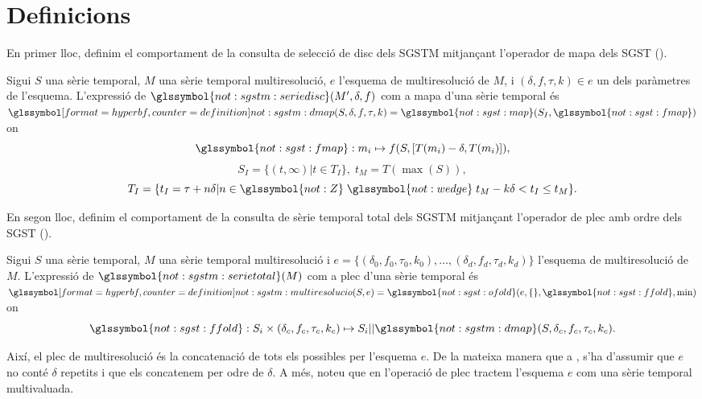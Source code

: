 \section{Definicions}

En primer lloc, definim el comportament de la consulta de selecció de disc
dels \gls{SGSTM} mitjançant l'operador de mapa dels \gls{SGST}
().


\begin{definition}
Sigui $S$ una sèrie temporal, $M$ una sèrie temporal multiresolució,
$e$ l'esquema de multiresolució de $M$, i $(\delta,f,\tau,k)\in e$
un dels paràmetres de l'esquema. L'expressió de
$\glssymbol{not:sgstm:seriedisc}(M',\delta,f)$ com a mapa d'una sèrie
temporal és $\glssymboldef{not:sgstm:dmap}(S,\delta,f,\tau,k)=
\glssymbol{not:sgst:map}(S_I,\glssymbol{not:sgst:fmap})$ on
  \[
  \glssymbol{not:sgst:fmap}: m_i\mapsto f(S, [T(m_i)-\delta,T(m_i)]),
  \]
  \[
  S_I = \{ (t,\infty) | t\in T_I  \},\;  t_M = T(\max(S)),
  \]
  \[
  T_I = \{ t_I = \tau+n\delta | n\in\glssymbol{not:Z}\; \glssymbol{not:wedge}\; t_M - k\delta <
  t_I \leq t_M \}.
  \]
\end{definition}




En segon lloc, definim el comportament de la consulta de sèrie
temporal total dels \gls{SGSTM} mitjançant l'operador de plec amb
ordre dels \gls{SGST} ().


\begin{definition}
  Sigui $S$ una sèrie temporal, $M$ una sèrie temporal multiresolució
  i $e = \{ (\delta_0,f_0,\tau_0,k_0), \ldots,
  (\delta_d,f_d,\tau_d,k_d)\}$ l'esquema de multiresolució de $M$.
  L'expressió de $\glssymbol{not:sgstm:serietotal}(M)$ com a plec
  d'una sèrie temporal és
  $\glssymboldef{not:sgstm:multiresolucio}(S,e)=
  \glssymbol{not:sgst:ofold}(e,\{\},\glssymbol{not:sgst:ffold},\min)$
  on 
  \[
  \glssymbol{not:sgst:ffold}: S_i \times (\delta_c,f_c,\tau_c,k_c)
  \mapsto S_i ||
  \glssymbol{not:sgstm:dmap}(S,\delta_c,f_c,\tau_c,k_c).
  \]
  
  Així, el plec de multiresolució és la concatenació de tots els
   possibles per l'esquema $e$. De la
  mateixa manera que a , s'ha d'assumir que
  $e$ no conté $\delta$ repetits i que els concatenem per odre de
  $\delta$. A més, noteu que en l'operació de plec tractem l'esquema
  $e$ com una sèrie temporal multivaluada.

\end{definition}





